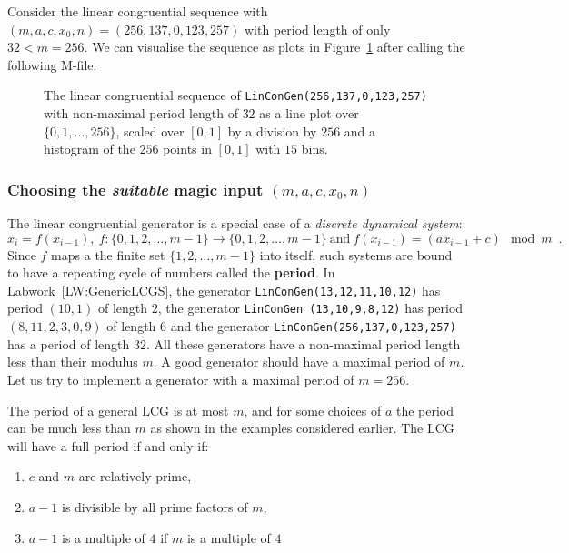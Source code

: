 \begin{labwork}\label{LW:LinConGenKnuth334T1L5}
Consider the linear congruential sequence with $(m,a,c,x_0,n)=(256,137,0,123,257)$ with period length of only $32 < m=256$.  We can visualise the sequence as plots in Figure~\ref{F:LinConGenKnuth334T1L5Plots} after calling the following M-file.
\end{labwork}

\begin{figure}[htbp]
\caption{The linear congruential sequence of {\tt LinConGen(256,137,0,123,257)} with non-maximal period length of $32$ as a line plot over $\{0,1,\ldots,256\}$, scaled over $[0,1]$ by a division by $256$ and a histogram of the $256$ points in $[0,1]$ with $15$ bins.\label{F:LinConGenKnuth334T1L5Plots}}
\centering   {}
\end{figure}


\subsubsection*{Choosing the {\em suitable} magic input $(m,a,c,x_0,n)$}

The linear congruential  generator is a special case of a {\em discrete dynamical system}: 
\[
x_{i}  = f(x_{i-1}), \ f: \{0,1,2,\ldots,m-1\} \to \{0,1,2,\ldots,m-1\} \ \text{and} \ f(x_{i-1})=(a x_{i-1} + c) \mod m\enspace .
\]  
Since $f$ maps a the finite set $\{1,2,\ldots,m-1\}$ into itself, such systems are bound to have a repeating cycle of numbers called the {\bf period}.  In Labwork~\ref{LW:GenericLCGS}, the generator {\tt LinConGen(13,12,11,10,12)} has period $(10,1)$ of length $2$, the generator {\tt LinConGen (13,10,9,8,12)} has period $(8, 11, 2, 3, 0, 9)$ of length $6$ and the generator {\tt LinConGen(256,137,0,123,257)} has a period of length $32$.  All these generators have a non-maximal period length less than their modulus $m$.  A good generator should have a maximal period of $m$.  Let us try to implement a generator with a maximal period of $m=256$.


The period of a general LCG is at most $m$, and for some choices of $a$ the period can be much less than $m$ as shown in the examples considered earlier.  The LCG will have a full period if and only if:
\begin{enumerate}
\item $c$ and $m$  are relatively prime,
\item  $a-1$ is divisible by all prime factors of $m$,
\item  $a-1$ is a multiple of $4$ if  $m$ is a multiple of $4$
\end{enumerate}

